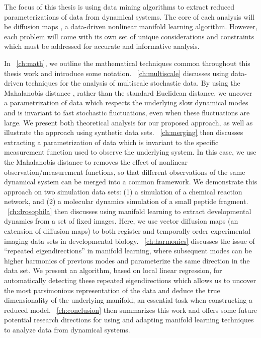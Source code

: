 The focus of this thesis is using data mining algorithms to extract reduced parameterizations of data from dynamical systems.
%
The core of each analysis will be diffusion maps \citep{Coifman2006}, a data-driven nonlinear manifold learning algorithm.
%
However, each problem will come with its own set of unique considerations and constraints which must be addressed for accurate and informative analysis.

In \chap~\ref{ch:math}, we outline the mathematical techniques common throughout this thesis work and introduce some notation.
%
\chap~\ref{ch:multiscale} discusses using data-driven techniques for the analysis of multiscale stochastic data.
%
By using the Mahalanobis distance \cite{mahalanobis1936generalized}, rather than the standard Euclidean distance, we uncover a parametrization of data which respects the underlying slow dynamical modes and is invariant to fast stochastic fluctuations, even when these fluctuations are large.
%
We present both theoretical analysis for our proposed approach, as well as illustrate the approach using synthetic data sets.
%
\chap~\ref{ch:merging} then discusses extracting a parametrization of data which is invariant to the specific measurement function used to observe the underlying system.
%
In this case, we use the Mahalanobis distance to removes the effect of nonlinear observation/measurement functions, so that different observations of the same dynamical system can be merged into a common framework.
%
We demonstrate this approach on two simulation data sets: (1) a simulation of a chemical reaction network, and (2) a molecular dynamics simulation of a small peptide fragment.
%
\chap~\ref{ch:drosophila} then discusses using manifold learning to extract developmental dynamics from a set of fixed images.
%
Here, we use vector diffusion maps (an extension of diffusion maps) to both register and temporally order experimental imaging data sets in developmental biology.
%
\chap~\ref{ch:harmonics} discusses the issue of ``repeated eigendirections'' in manifold learning, where subsequent modes can be higher harmonics of previous modes and parameterize the same direction in the data set.
%
We present an algorithm, based on local linear regression, for automatically detecting these repeated eigendirections which allows us to uncover the most parsimonious representation of the data and deduce the true dimensionality of the underlying manifold, an essential task when constructing a reduced model.
%
\chap~\ref{ch:conclusion} then summarizes this work and offers some future potential research directions for using and adapting manifold learning techniques to analyze data from dynamical systems. 